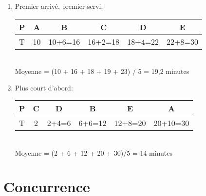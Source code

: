 \begin{enumerate}
\begin{correction}
\begin{enumerate}[label=(\alph*)]
\item Premier arrivé, premier servi:\\
      \begin{tabular}{|c||c|c|c|c|c|}
      \hline
      P & A & B & C & D & E\tabularnewline
      \hline
      T & 10 & 10+6=16 & 16+2=18 & 18+4=22 & 22+8=30\tabularnewline
      \hline
      \end{tabular}\\
      Moyenne = (10 + 16 + 18 + 19 + 23) / 5 = 19,2 minutes

\item Plus court d’abord:\\
      \begin{tabular}{|c||c|c|c|c|c|}
      \hline
      P & C & D & B & E & A\tabularnewline
      \hline
      T & 2 & 2+4=6 & 6+6=12 & 12+8=20 & 20+10=30\tabularnewline
      \hline
      \end{tabular}\\
      Moyenne = (2 + 6 + 12 + 20 + 30)/5 = 14 minutes
\end{enumerate}
\end{correction}

\end{enumerate}


\section{{Concurrence}
         {\hfill{} }}

